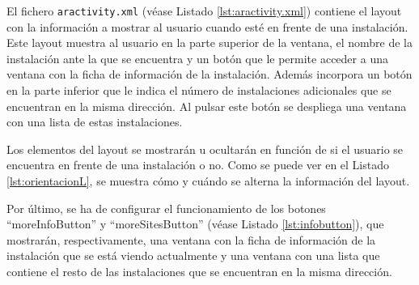
 
El fichero \texttt{aractivity.xml} (véase Listado \ref{lst:aractivity.xml}) contiene el layout con la información a mostrar al usuario cuando esté en frente de una instalación. Este layout muestra al usuario en la parte superior de la ventana, el nombre de la instalación ante la que se encuentra y un botón que le permite acceder a una ventana con la ficha de información de la instalación. Además incorpora un botón en la parte inferior que le indica el número de instalaciones adicionales que se encuentran en la misma dirección. Al pulsar este botón se despliega una ventana con una lista de estas instalaciones.



Los elementos del layout se mostrarán u ocultarán en función de si el usuario se  encuentra en frente de una instalación o no. Como se puede ver en el Listado \ref{lst:orientacionL}, se muestra cómo y cuándo se alterna la información del layout.

Por último, se ha de configurar el funcionamiento de los botones ``moreInfoButton'' y ``moreSitesButton'' (véase Listado \ref{lst:infobutton}), que mostrarán, respectivamente, una ventana con la ficha de información de la instalación que se está viendo actualmente y una ventana con una lista que contiene el resto de las instalaciones que se encuentran en la misma dirección. 

